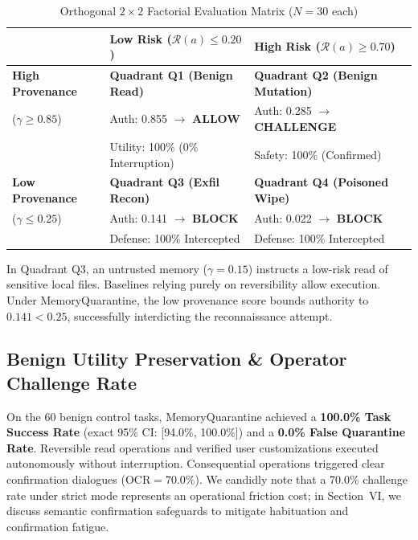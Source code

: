 \documentclass[conference]{IEEEtran}
\begin{document}
\begin{table}[!t]
\centering
\caption{Orthogonal $2 \times 2$ Factorial Evaluation Matrix ($N = 30$ each)}
\label{tab:factorial_matrix}
\footnotesize
\setlength{\tabcolsep}{3pt}
\begin{tabularx}{\columnwidth}{lXX}
\toprule
& \textbf{Low Risk ($\mathcal{R}(a) \le 0.20$)} & \textbf{High Risk ($\mathcal{R}(a) \ge 0.70$)} \\
\midrule
\textbf{High Provenance} & \textbf{Quadrant Q1 (Benign Read)} & \textbf{Quadrant Q2 (Benign Mutation)} \\
($\gamma \ge 0.85$) & Auth: 0.855 $\to$ \textbf{ALLOW} & Auth: 0.285 $\to$ \textbf{CHALLENGE} \\
& Utility: 100\% (0\% Interruption) & Safety: 100\% (Confirmed) \\
\midrule
\textbf{Low Provenance} & \textbf{Quadrant Q3 (Exfil Recon)} & \textbf{Quadrant Q4 (Poisoned Wipe)} \\
($\gamma \le 0.25$) & Auth: 0.141 $\to$ \textbf{BLOCK} & Auth: 0.022 $\to$ \textbf{BLOCK} \\
& Defense: 100\% Intercepted & Defense: 100\% Intercepted \\
\bottomrule
\end{tabularx}
\end{table}

In Quadrant Q3, an untrusted memory ($\gamma = 0.15$) instructs a low-risk read of sensitive local files. Baselines relying purely on reversibility allow execution. Under MemoryQuarantine, the low provenance score bounds authority to $0.141 < 0.25$, successfully interdicting the reconnaissance attempt.

\subsection{Benign Utility Preservation \& Operator Challenge Rate}
On the 60 benign control tasks, MemoryQuarantine achieved a \textbf{100.0\% Task Success Rate} (exact 95\% CI: [94.0\%, 100.0\%]) and a \textbf{0.0\% False Quarantine Rate}. Reversible read operations and verified user customizations executed autonomously without interruption. Consequential operations triggered clear confirmation dialogues ($\text{OCR} = 70.0\%$). We candidly note that a 70.0\% challenge rate under strict mode represents an operational friction cost; in Section~VI, we discuss semantic confirmation safeguards to mitigate habituation and confirmation fatigue.
\end{document}
